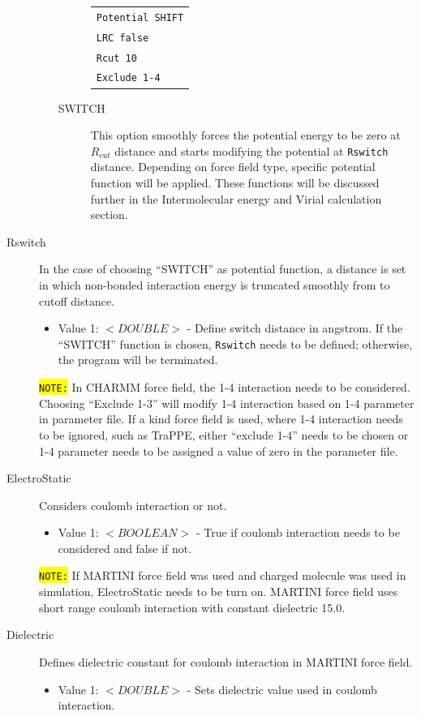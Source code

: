 \begin{description}
\begin{itemize}
\begin{description}
{\begin{tabular}{l}
		\texttt{Potential SHIFT}\\
		\texttt{LRC false}\\
		\texttt{Rcut 10}\\
		\texttt{Exclude 1-4}\\
		\end{tabular}}
		\item [SWITCH] This option smoothly forces the potential energy to be zero at $R_{cut}$ distance and starts modifying the potential at \texttt{Rswitch} distance. Depending on force field type, specific potential function will be applied. These functions will be discussed further in the Intermolecular energy and Virial calculation section.
		\end{description}
	\end{itemize}
\item [Rswitch] In the case of choosing “SWITCH” as potential function, a distance is set in which non-bonded interaction energy is truncated smoothly from to cutoff distance.
	\begin{itemize}
	\item Value 1: $<DOUBLE>$ - Define switch distance in angstrom. If the ``SWITCH'' function is chosen, \texttt{Rswitch} needs to be defined; otherwise, the program will be terminated. 
	\end{itemize}
\colorbox{yellow}{\texttt{NOTE:}} In CHARMM force field, the 1-4 interaction needs to be considered. Choosing ``Exclude 1-3'' will modify 1-4 interaction based on 1-4 parameter in parameter file. If a kind force field is used, where 1-4 interaction needs to be ignored, such as TraPPE, either ``exclude 1-4'' needs to be chosen or 1-4 parameter needs to be assigned a value of zero in the parameter file.
\item [ElectroStatic] Considers coulomb interaction or not.
	\begin{itemize}
	\item Value 1: $<BOOLEAN>$ - True if coulomb interaction needs to be considered and false if not.
	\end{itemize}
	\colorbox{yellow}{\texttt{NOTE:}} If MARTINI force field was used and charged molecule was used in simulation, ElectroStatic needs to be turn on. MARTINI force field uses short range coulomb interaction with constant dielectric 15.0.
\item [Dielectric] Defines dielectric constant for coulomb interaction in MARTINI force field.
	\begin{itemize}
	\item Value 1: $<DOUBLE>$ - Sets dielectric value used in coulomb interaction.

\end{itemize}
\end{description}
